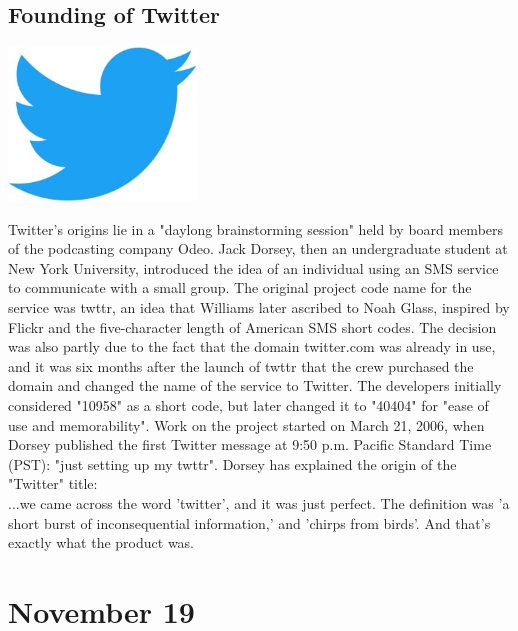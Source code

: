 \documentclass[11pt]{report}
\begin{document}
\subsection{Founding of Twitter}
\vspace{2mm}\begin{center}\includegraphics[width=5cm]{./img/twitter.jpg}\end{center}
Twitter's origins lie in a "daylong brainstorming session" held by board members of the podcasting company Odeo. Jack Dorsey, then an undergraduate student at New York University, introduced the idea of an individual using an SMS service to communicate with a small group. The original project code name for the service was twttr, an idea that Williams later ascribed to Noah Glass, inspired by Flickr and the five-character length of American SMS short codes. The decision was also partly due to the fact that the domain twitter.com was already in use, and it was six months after the launch of twttr that the crew purchased the domain and changed the name of the service to Twitter. The developers initially considered "10958" as a short code, but later changed it to "40404" for "ease of use and memorability". Work on the project started on March 21, 2006, when Dorsey published the first Twitter message at 9:50 p.m. Pacific Standard Time (PST): "just setting up my twttr". Dorsey has explained the origin of the "Twitter" title:\\
\indent ...we came across the word 'twitter', and it was just perfect. The definition was 'a short burst of inconsequential information,' and 'chirps from birds'. And that's exactly what the product was.
\section{November 19}
\end{document}
